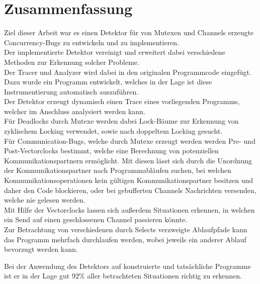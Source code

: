 \chapter{Zusammenfassung}\label{chap:conclusion}
Ziel dieser Arbeit war es einen Detektor für von Mutexen 
und Channels erzeugte Concurrency-Bugs zu entwickeln und zu implementieren.\\
Der implementierte Detektor vereinigt und erweitert dabei verschiedene Methoden 
zur Erkennung solcher Probleme.\\
Der Tracer und Analyzer wird dabei in den originalen Programmcode eingefügt.
Dazu wurde ein Programm entwickelt, welches in der Lage ist diese Instrumentierung
automatisch auszuführen.\\
Der Detektor erzeugt dynamisch einen Trace 
eines vorliegenden Programms, welcher im Anschluss analysiert werden kann.\\
Für Deadlocks durch Mutexe werden dabei Lock-Bäume zur Erkennung von zyklischem 
Locking verwendet, sowie nach doppeltem Locking gesucht.\\
Für Communication-Bugs, welche durch Mutexe erzeugt werden
werden Pre- und Post-Vectorclocks bestimmt, welche eine Berechnung
von potenziellen Kommunikationspartnern ermöglicht. Mit diesen lässt sich 
durch die Unordnung der Kommunikationspartner nach Programmabläufen suchen, 
bei welchen Kommunikationsoperationen kein gültigen Kommunikationspartner 
besitzen und daher den Code blockieren, oder bei gebufferten Channels 
Nachrichten versenden, welche nie gelesen werden. \\
Mit Hilfe der Vectorclocks lassen sich außerdem Situationen erkennen, 
in welchen ein Send auf einen geschlossenen Channel passieren könnte.\\
Zur Betrachtung von verschiedenen durch Selects verzweigte Ablaufpfade
kann das Programm mehrfach durchlaufen werden, wobei jeweils ein 
anderer Ablauf bevorzugt werden kann.

Bei der Anwendung des Detektors auf konstruierte und tatsächliche Programme 
ist er in der Lage gut $92\%$ aller betrachteten 
Situationen richtig zu erkennen. 